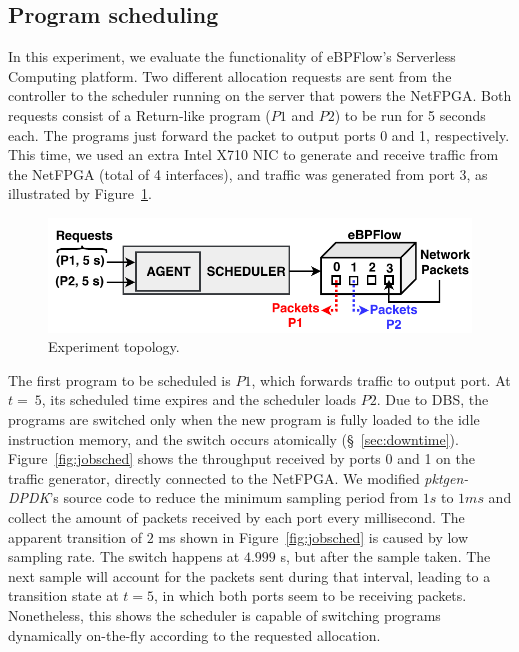 \subsection{Program scheduling}

In this experiment, we evaluate the functionality of eBPFlow's Serverless Computing platform. Two different allocation requests are sent from the controller to the scheduler running on the server that powers the NetFPGA. Both requests consist of a Return-like program ($P1$ and $P2$) to be run for 5 seconds each. The programs just forward the packet to output ports 0 and 1, respectively. This time, we used an extra Intel X710 NIC to generate and receive traffic from the NetFPGA (total of 4 interfaces), and traffic was generated from port 3, as illustrated by Figure~\ref{fig:request}.
 
\begin{figure}[H]
\centering
\includegraphics[width=1.0\columnwidth]{figures/request.pdf}
\caption{Experiment topology.}
\label{fig:request}
\end{figure}

The first program to be scheduled is $P1$, which forwards traffic to output port. At $t=~5$, its scheduled time expires and the scheduler loads $P2$. Due to DBS, the programs are switched only when the new program is fully loaded to the idle instruction memory, and the switch occurs atomically (\S~\ref{sec:downtime}). Figure~\ref{fig:jobsched} shows the throughput received by ports 0 and 1 on the traffic generator, directly connected to the NetFPGA. We modified \textit{pktgen-DPDK}'s source code to reduce the minimum sampling period from $1 s$ to $1 ms$ and collect the amount of packets received by each port every millisecond. The apparent transition of $2$ ms shown in Figure~\ref{fig:jobsched} is caused by low sampling rate. The switch happens at $4.999$ s, but after the sample taken. The next sample will account for the packets sent during that interval, leading to a transition state at $t=5$, in which both ports seem to be receiving packets. Nonetheless, this shows the scheduler is capable of switching programs dynamically on-the-fly according to the requested allocation.

